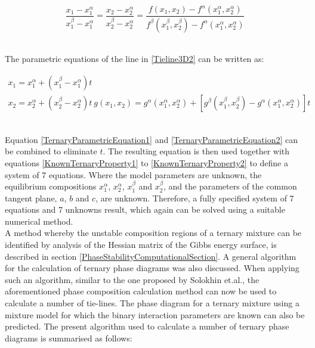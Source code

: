 \begin{equation}
\dfrac{x_{1}- x_{1}^{\alpha}}{x_{1}^{\beta} - x_{1}^{\alpha}} = \dfrac{x_{2}- x_{2}^{\alpha}}{x_{2}^{\beta} - x_{2}^{\alpha}} = \dfrac{f\left(x_{1}, x_{2}\right)- f^{\alpha}\left(x_{1}^{\alpha}, x_{2}^{\alpha}\right)}{f^{\beta}\left(x_{1}^{\beta}, x_{2}^{\beta}\right) - f^{\alpha}\left(x_{1}^{\alpha}, x_{2}^{\alpha}\right)} \label{Tieline3D2}
\end{equation}\

The parametric equations of the line in \ref{Tieline3D2} can be written as:\

\begin{eqnarray}
x_{1} = x_{1}^{\alpha} + \left(x_{1}^{\beta} - x_{1}^{\alpha}\right)t\\
x_{2} = x_{2}^{\alpha} + \left(x_{2}^{\beta} - x_{2}^{\alpha}\right)t\label{TernaryParametricEquation1}\
g\left(x_{1}, x_{2}\right) =  g^{\alpha}\left(x_{1}^{\alpha}, x_{2}^{\alpha}\right) + \left[g^{\beta}\left(x_{1}^{\beta}, x_{2}^{\beta}\right) - g^{\alpha}\left(x_{1}^{\alpha}, x_{2}^{\alpha}\right)\right]t \label{TernaryParametricEquation2}
\end{eqnarray}\

Equation \ref{TernaryParametricEquation1} and \ref{TernaryParametricEquation2} can be combined to eliminate $t$. The resulting equation is then used together with equations \ref{KnownTernaryProperty1} to \ref{KnownTernaryProperty2} to define a system of 7 equations. Where the model parameters are unknown, the equilibrium compositions $x_{1}^{\alpha}$, $x_{2}^{\alpha}$, $x_{1}^{\beta}$ and $x_{2}^{\beta}$, and the parameters of the common tangent plane, $a$, $b$ and $c$, are unknown. Therefore, a fully specified system of 7 equations and 7 unknowns result, which again can be solved using a suitable numerical method.\\

A method whereby the unstable composition regions of a ternary mixture can be identified by analysis of the Hessian matrix of the Gibbs energy surface, is described in section \ref{PhaseStabilityComputationalSection}. A general algorithm for the calculation of ternary phase diagrams was also discussed. When applying such an algorithm, similar to the one proposed by Solokhin et.al., the aforementioned phase composition calculation method can now be used to calculate a number of tie-lines. The phase diagram for a ternary mixture using a mixture model for which the binary interaction parameters are known can also be predicted. The present algorithm used to calculate a number of ternary phase diagrams is summarised as follows:\

